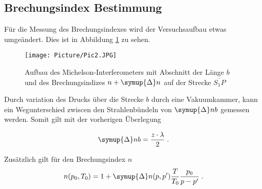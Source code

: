 \subsection{Brechungsindex Bestimmung}
Für die Messung des Brechungsindexes wird der Versuchsaufbau etwas umgeändert. Dies ist in Abbildung \ref{fig:2} zu sehen.

\begin{figure}
    \centering
    \texttt{[image: Picture/Pic2.JPG]}
    \caption{Aufbau des Michelson-Interferometers mit Abschnitt der Länge $b$ und des
    Brechungsindizes $n + \symup{\Delta}n$ auf der Strecke $\overline{S_1 P}$}
    \label{fig:2}
  \end{figure}
\noindent
Durch variation des Drucks über die Strecke $b$ durch eine Vakuumkammer, kann ein Wegunterschied zwiscen den Strahlenbündeln von $\symup{\Delta}nb$ gemessen werden. Somit 
gilt mit der vorherigen Überlegung

\begin{equation*}
    \symup{\Delta}nb = \frac{z \cdot \lambda}{2} \; .
    \label{eqn:nb2}
  \end{equation*}

Zusätzlich gilt für den Brechungsindex $n$ 
\begin{equation*}
  n(p_0, T_0) = 1 + \symup{\Delta} n (p,p') \frac{T}{T_0} \frac{p_0}{p - p'} \; .
  \label{eqn:brech}
\end{equation*}

